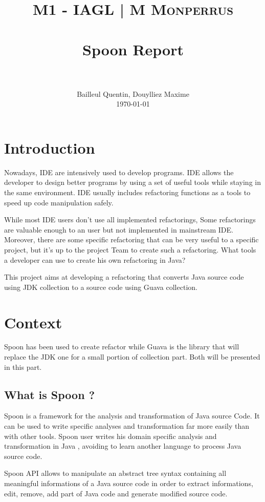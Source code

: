 \documentclass[paper=a4, fontsize=11pt]{scrartcl}
\title{
  \usefont{OT1}{bch}{b}{n}
  \normalfont \normalsize \textsc{M1 - IAGL | M Monperrus}
  \\ [25pt]
  \horrule{0.5pt} \\[0.4cm]
  \huge Spoon Report\\
  \horrule{2pt} \\[0.5cm]
}
\author{
  \normalfont \normalsize
  Bailleul Quentin, Douylliez Maxime\\[-3pt]\normalsize
        \today
}
\date{}
\numberwithin{equation}{section}%
\numberwithin{figure}{section}%
\numberwithin{table}{section}%
\begin{document}
\maketitle
\tableofcontents



\newpage

\section{Introduction}
Nowadays, IDE are intensively used to develop programs.  IDE allows
the developer to design better programs by using a set of useful tools
while staying in the same environment. IDE usually includes
refactoring functions as a tools to speed up code manipulation safely.
\newline


While most IDE users don't use all implemented refactorings, Some
refactorings are valuable enough to an user but not implemented in
mainstream IDE. Moreover, there are some specific refactoring that can
be very useful to a specific project, but it's up to the project Team
to create such a refactoring. What tools a developer can use to create
his own refactoring in Java?
\newline

This project aims at developing a refactoring that converts Java
source code using JDK collection to a source code using Guava
collection.
\newpage


\section{Context}
Spoon has been used to create refactor while Guava is the library that
will replace the JDK one for a small portion of collection part. Both
will be presented in this part.  


\subsection{What is Spoon ?}
Spoon is a framework for the analysis and transformation of Java
source Code. It can be used to write specific analyses and
transformation far more easily than with other tools. Spoon user
writes his domain specific analysis and transformation in Java ,
avoiding to learn another language to process Java source code. 

\newline Spoon API allows to manipulate an abstract tree syntax containing all
meaningful informations of a Java source code in order to extract
informations, edit, remove, add part of Java code and generate
modified source code.
\end{document}
